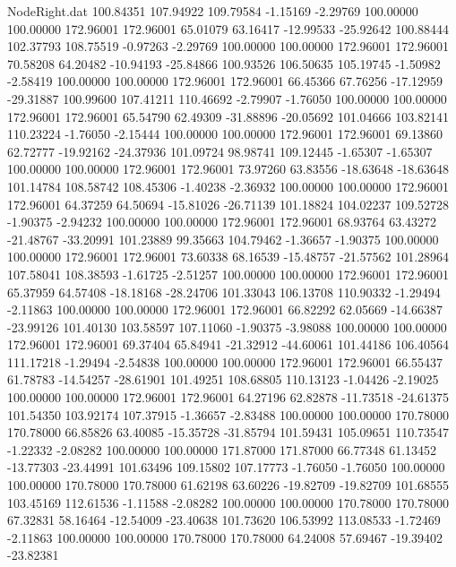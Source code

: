 \begin{filecontents}{NodeRight.dat}
 100.84351  107.94922  109.79584    -1.15169   -2.29769  100.00000  100.00000  172.96001  172.96001   65.01079   63.16417  -12.99533  -25.92642
 100.88444  102.37793  108.75519    -0.97263   -2.29769  100.00000  100.00000  172.96001  172.96001   70.58208   64.20482  -10.94193  -25.84866
 100.93526  106.50635  105.19745    -1.50982   -2.58419  100.00000  100.00000  172.96001  172.96001   66.45366   67.76256  -17.12959  -29.31887
 100.99600  107.41211  110.46692    -2.79907   -1.76050  100.00000  100.00000  172.96001  172.96001   65.54790   62.49309  -31.88896  -20.05692
 101.04666  103.82141  110.23224    -1.76050   -2.15444  100.00000  100.00000  172.96001  172.96001   69.13860   62.72777  -19.92162  -24.37936
 101.09724   98.98741  109.12445    -1.65307   -1.65307  100.00000  100.00000  172.96001  172.96001   73.97260   63.83556  -18.63648  -18.63648
 101.14784  108.58742  108.45306    -1.40238   -2.36932  100.00000  100.00000  172.96001  172.96001   64.37259   64.50694  -15.81026  -26.71139
 101.18824  104.02237  109.52728    -1.90375   -2.94232  100.00000  100.00000  172.96001  172.96001   68.93764   63.43272  -21.48767  -33.20991
 101.23889   99.35663  104.79462    -1.36657   -1.90375  100.00000  100.00000  172.96001  172.96001   73.60338   68.16539  -15.48757  -21.57562
 101.28964  107.58041  108.38593    -1.61725   -2.51257  100.00000  100.00000  172.96001  172.96001   65.37959   64.57408  -18.18168  -28.24706
 101.33043  106.13708  110.90332    -1.29494   -2.11863  100.00000  100.00000  172.96001  172.96001   66.82292   62.05669  -14.66387  -23.99126
 101.40130  103.58597  107.11060    -1.90375   -3.98088  100.00000  100.00000  172.96001  172.96001   69.37404   65.84941  -21.32912  -44.60061
 101.44186  106.40564  111.17218    -1.29494   -2.54838  100.00000  100.00000  172.96001  172.96001   66.55437   61.78783  -14.54257  -28.61901
 101.49251  108.68805  110.13123    -1.04426   -2.19025  100.00000  100.00000  172.96001  172.96001   64.27196   62.82878  -11.73518  -24.61375
 101.54350  103.92174  107.37915    -1.36657   -2.83488  100.00000  100.00000  170.78000  170.78000   66.85826   63.40085  -15.35728  -31.85794
 101.59431  105.09651  110.73547    -1.22332   -2.08282  100.00000  100.00000  171.87000  171.87000   66.77348   61.13452  -13.77303  -23.44991
 101.63496  109.15802  107.17773    -1.76050   -1.76050  100.00000  100.00000  170.78000  170.78000   61.62198   63.60226  -19.82709  -19.82709
 101.68555  103.45169  112.61536    -1.11588   -2.08282  100.00000  100.00000  170.78000  170.78000   67.32831   58.16464  -12.54009  -23.40638
 101.73620  106.53992  113.08533    -1.72469   -2.11863  100.00000  100.00000  170.78000  170.78000   64.24008   57.69467  -19.39402  -23.82381

\end{filecontents}
